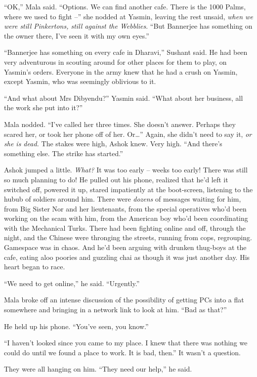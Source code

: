 ``OK,'' Mala said. ``Options. We can find another cafe. There is the
1000 Palms, where we used to fight --'' she nodded at Yasmin,
leaving the rest unsaid,
\emph{when we were still Pinkertons, still against the Webblies}.
``But Bannerjee has something on the owner there, I've seen it with
my own eyes.''

``Bannerjee has something on every cafe in Dharavi,'' Sushant said.
He had been very adventurous in scouting around for other places
for them to play, on Yasmin's orders. Everyone in the army knew
that he had a crush on Yasmin, except Yasmin, who was seemingly
oblivious to it.

``And what about Mrs Dibyendu?'' Yasmin said. ``What about her
business, all the work she put into it?''

Mala nodded. ``I've called her three times. She doesn't answer.
Perhaps they scared her, or took her phone off of her. Or\ldots{}''
Again, she didn't need to say it, \emph{or she is dead.} The stakes
were high, Ashok knew. Very high. ``And there's something else. The
strike has started.''

Ashok jumped a little. \emph{What?} It was too early -- weeks too
early! There was still so much planning to do! He pulled out his
phone, realized that he'd left it switched off, powered it up,
stared impatiently at the boot-screen, listening to the hubub of
soldiers around him. There were \emph{dozens} of messages waiting
for him, from Big Sister Nor and her lieutenants, from the special
operatives who'd been working on the scam with him, from the
American boy who'd been coordinating with the Mechanical Turks.
There had been fighting online and off, through the night, and the
Chinese were thronging the streets, running from cops, regrouping.
Gamespace was in chaos. And he'd been arguing with drunken
thug-boys at the cafe, eating aloo poories and guzzling chai as
though it was just another day. His heart began to race.

``We need to get online,'' he said. ``Urgently.''

Mala broke off an intense discussion of the possibility of getting
PCs into a flat somewhere and bringing in a network link to look at
him. ``Bad as that?''

He held up his phone. ``You've seen, you know.''

``I haven't looked since you came to my place. I knew that there was
nothing we could do until we found a place to work. It is bad,
then.'' It wasn't a question.

They were all hanging on him. ``They need our help,'' he said.

